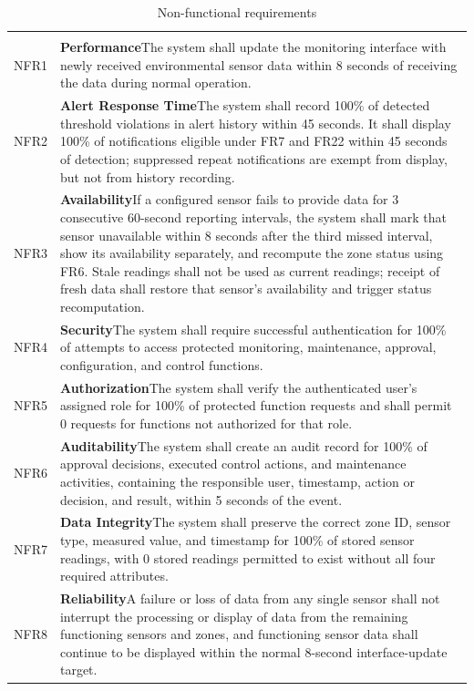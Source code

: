 \documentclass[11pt,a4paper]{article}
\newcommand{\reqhead}[1]{%
  \caption{#1}\\
  \hline\headrow \hd{ID} & \hd{Requirement}\\\hline
  \endfirsthead
  \hline\headrow \hd{ID} & \hd{Requirement}\\\hline
  \endhead}
\newcommand{\nfr}[2]{\textbf{#1}\newline #2}
\begin{document}
{\small\stripe
\begin{xltabular}{\linewidth}{|B{1.3cm}|Y|}
\reqhead{Non-functional requirements}\label{tab:nfr}
NFR1 & \nfr{Performance}{The system shall update the monitoring interface with newly received environmental sensor data within 8 seconds of receiving the data during normal operation.}\\\hline
NFR2 & \nfr{Alert Response Time}{The system shall record 100\% of detected threshold violations in alert history within 45 seconds. It shall display 100\% of notifications eligible under FR7 and FR22 within 45 seconds of detection; suppressed repeat notifications are exempt from display, but not from history recording.}\\\hline
NFR3 & \nfr{Availability}{If a configured sensor fails to provide data for 3 consecutive 60-second reporting intervals, the system shall mark that sensor unavailable within 8 seconds after the third missed interval, show its availability separately, and recompute the zone status using FR6. Stale readings shall not be used as current readings; receipt of fresh data shall restore that sensor's availability and trigger status recomputation.}\\\hline
NFR4 & \nfr{Security}{The system shall require successful authentication for 100\% of attempts to access protected monitoring, maintenance, approval, configuration, and control functions.}\\\hline
NFR5 & \nfr{Authorization}{The system shall verify the authenticated user's assigned role for 100\% of protected function requests and shall permit 0 requests for functions not authorized for that role.}\\\hline
NFR6 & \nfr{Auditability}{The system shall create an audit record for 100\% of approval decisions, executed control actions, and maintenance activities, containing the responsible user, timestamp, action or decision, and result, within 5 seconds of the event.}\\\hline
NFR7 & \nfr{Data Integrity}{The system shall preserve the correct zone ID, sensor type, measured value, and timestamp for 100\% of stored sensor readings, with 0 stored readings permitted to exist without all four required attributes.}\\\hline
NFR8 & \nfr{Reliability}{A failure or loss of data from any single sensor shall not interrupt the processing or display of data from the remaining functioning sensors and zones, and functioning sensor data shall continue to be displayed within the normal 8-second interface-update target.}\\\hline

\end{xltabular}}
\end{document}
